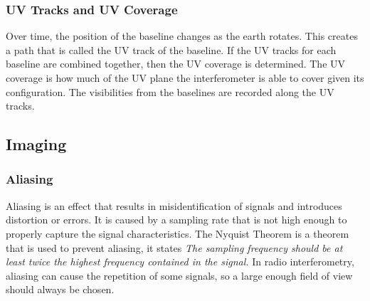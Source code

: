 \subsubsection{UV Tracks and UV Coverage}
Over time, the position of the baseline changes as the earth rotates. This creates a path that is called the UV track of the baseline. If the UV tracks for each baseline are combined together, then the UV coverage is determined. The UV coverage is how much of the UV plane the interferometer is able to cover given its configuration. The visibilities from the baselines are recorded along the UV tracks. 

\subsection{Imaging}
\subsubsection{Aliasing}\label{sec:Aliasing}
Aliasing is an effect that results in misidentification of signals and introduces distortion or errors. It is caused by a sampling rate that is not high enough to properly capture the signal characteristics\cite{aliasing}. The Nyquist Theorem is a theorem that is used to prevent aliasing, it states \textit{The sampling frequency should be at least twice the highest frequency contained in the signal\cite{aliasing}.} In radio interferometry, aliasing can cause the repetition of some signals, so a large enough field of view should always be chosen.


